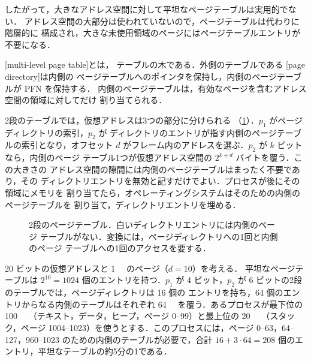 \documentclass[../main.tex]{subfiles}
\begin{document}
したがって，大きなアドレス空間に対して平坦なページテーブルは実用的でない．
アドレス空間の大部分は使われていないので，ページテーブルは代わりに階層的に
構成され，大きな未使用領域のページにはページテーブルエントリが不要になる．

\begin{definition}[多段ページテーブル]
  [multi-level page table]とは，
  テーブルの木である．外側のテーブルである
  [page directory]は内側の
  ページテーブルへのポインタを保持し，内側のページテーブルが PFN を保持する．
  内側のページテーブルは，有効なページを含むアドレス空間の領域に対してだけ
  割り当てられる．
\end{definition}

2段のテーブルでは，仮想アドレスは3つの部分に分けられる
（\cref{fig:l08-multilevel}）．$p_1$ がページディレクトリの索引，$p_2$ が
ディレクトリのエントリが指す内側のページテーブルの索引となり，オフセット
$d$ がフレーム内のアドレスを選ぶ．$p_2$ が $k$ ビットなら，内側のページ
テーブル1つが仮想アドレス空間の $2^{k+d}$ バイトを覆う．この大きさの
アドレス空間の隙間には内側のページテーブルはまったく不要であり，その
ディレクトリエントリを無効と記すだけでよい．プロセスが後にその領域にメモリを
割り当てたら，オペレーティングシステムはそのための内側のページテーブルを
割り当て，ディレクトリエントリを埋める．

\begin{figure}[htbp]
  \centering
  
  \caption{2段のページテーブル．白いディレクトリエントリには内側のページ
    テーブルがない．変換には，ページディレクトリへの1回と内側のページ
    テーブルへの1回のアクセスを要する．}
  \label{fig:l08-multilevel}
\end{figure}

\begin{example}
  \label{ex:l08-multilevel}
  20 ビットの仮想アドレスと \SI{1}{\kibi\byte} のページ（$d = 10$）を考える．
  平坦なページテーブルは $2^{10} = 1024$ 個のエントリを持つ．$p_1$ が 4
  ビット，$p_2$ が 6 ビットの2段のテーブルでは，ページディレクトリは 16 個の
  エントリを持ち，64 個のエントリからなる内側のテーブルはそれぞれ
  \SI{64}{\kibi\byte} を覆う．あるプロセスが最下位の \SI{100}{\kibi\byte}
  （テキスト，データ，ヒープ，ページ 0--99）と最上位の \SI{20}{\kibi\byte}
  （スタック，ページ 1004--1023）を使うとする．このプロセスには，ページ
  0--63，64--127，960--1023 のための内側のテーブルが必要で，合計
  $16 + 3 \cdot 64 = 208$ 個のエントリ，平坦なテーブルの約5分の1である．
\end{example}
\end{document}

